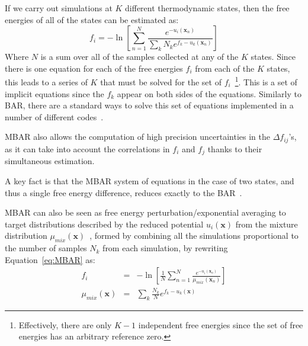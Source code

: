 \documentclass[9pt,review]{livecoms}
\newcommand{\vx}{\mathbf{x}}
\begin{document}
If we carry out simulations at $K$ different thermodynamic states,
then the free energies of all of the states can be estimated as:
\begin{equation}
f_i = -\ln \left[\sum_{n=1}^N \frac{e^{-u_i(\vx_n)}}{\sum_k N_k e^{f_k-u_k(\vx_n)}}\right]
\label{eq:MBAR}
\end{equation}
Where $N$ is a sum over all of the samples collected at any of the $K$ states.
Since there is one equation for each of the free energies $f_i$ from each of the $K$ states, this leads to a series of $K$ that must be solved for the set of $f_i$~\footnote{Effectively, there are only $K-1$ independent free energies since the set of free energies has an arbitrary reference zero.}. This is a set of implicit equations since the $f_k$ appear on both sides of the equations. Similarly to BAR, there are a standard ways to solve this set of equations implemented in a number of different codes~\cite{shirts-chodera:jcp:2008:mbar,tan_binless_2012,Zhang:JPCL:2015}.

MBAR also allows
the computation of high precision uncertainties in the $\Delta
f_{ij}$'s, as it can take into account the correlations in $f_i$ and
$f_j$ thanks to their simultaneous estimation.

A key fact is that the MBAR system of equations in the case of two states, and thus a single free energy difference, reduces exactly to the BAR~\cite{shirts-chodera:jcp:2008:mbar}.

MBAR can also be seen as free energy perturbation/exponential averaging to target distributions described by the reduced potential $u_i(\vx)$ from the mixture distribution $\mu_{mix}(\vx)$~\cite{reweighting_mixture_distribution}, formed by combining all the simulations proportional to the number of samples $N_k$ from each simulation, by rewriting Equation~\ref{eq:MBAR} as:
\begin{eqnarray}
f_i &=& -\ln \left[\frac{1}{N}\sum_{n=1}^N \frac{e^{-u_i(\vx_n)}}{\mu_{mix}(\vx_n)}\right] \nonumber\\
\mu_{mix}(\vx) &=& \sum_k \frac{N_k}{N} e^{f_k-u_k(\vx)}
\end{eqnarray}
\end{document}
